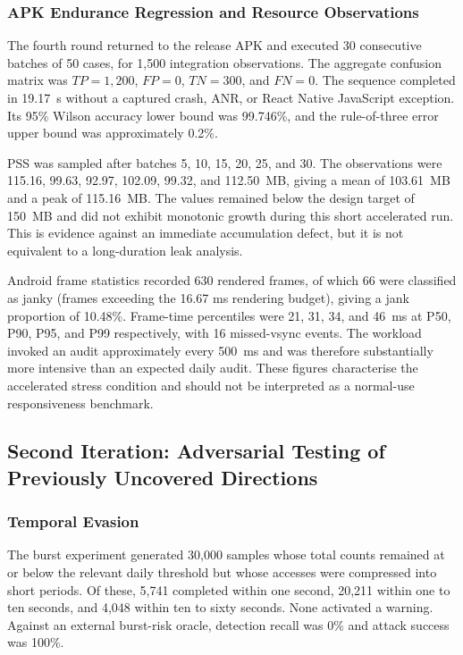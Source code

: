 \subsubsection{APK Endurance Regression and Resource Observations}

The fourth round returned to the release APK and executed 30 consecutive batches of 50 cases, for 1,500 integration observations. The aggregate confusion matrix was \(TP=1,200\), \(FP=0\), \(TN=300\), and \(FN=0\). The sequence completed in 19.17~s without a captured crash, ANR, or React Native JavaScript exception. Its 95\% Wilson accuracy lower bound was 99.746\%, and the rule-of-three error upper bound was approximately 0.2\%.

PSS was sampled after batches 5, 10, 15, 20, 25, and 30. The observations were 115.16, 99.63, 92.97, 102.09, 99.32, and 112.50~MB, giving a mean of 103.61~MB and a peak of 115.16~MB. The values remained below the design target of 150~MB and did not exhibit monotonic growth during this short accelerated run. This is evidence against an immediate accumulation defect, but it is not equivalent to a long-duration leak analysis.

Android frame statistics recorded 630 rendered frames, of which 66 were classified as janky (frames exceeding the 16.67 ms rendering budget), giving a jank proportion of 10.48\%. Frame-time percentiles were 21, 31, 34, and 46~ms at P50, P90, P95, and P99 respectively, with 16 missed-vsync events. The workload invoked an audit approximately every 500~ms and was therefore substantially more intensive than an expected daily audit. These figures characterise the accelerated stress condition and should not be interpreted as a normal-use responsiveness benchmark.

\subsection{Second Iteration: Adversarial Testing of Previously Uncovered Directions}

\subsubsection{Temporal Evasion}

The burst experiment generated 30,000 samples whose total counts remained at or below the relevant daily threshold but whose accesses were compressed into short periods. Of these, 5,741 completed within one second, 20,211 within one to ten seconds, and 4,048 within ten to sixty seconds. None activated a warning. Against an external burst-risk oracle, detection recall was 0\% and attack success was 100\%.

